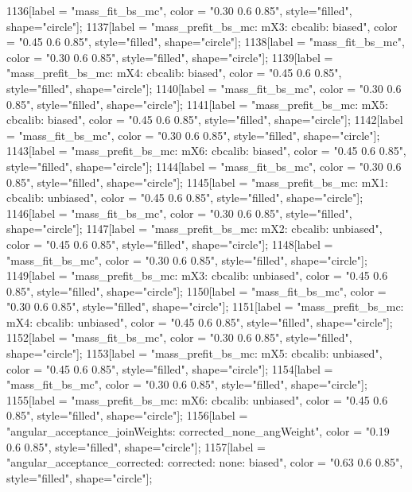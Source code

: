 {	1136[label = "mass_fit_bs_mc", color = "0.30 0.6 0.85", style="filled", shape="circle"];
	1137[label = "mass_prefit_bs_mc\nmassbin: mX3\nmassmodel: cbcalib\ntrigger: biased", color = "0.45 0.6 0.85", style="filled", shape="circle"];
	1138[label = "mass_fit_bs_mc", color = "0.30 0.6 0.85", style="filled", shape="circle"];
	1139[label = "mass_prefit_bs_mc\nmassbin: mX4\nmassmodel: cbcalib\ntrigger: biased", color = "0.45 0.6 0.85", style="filled", shape="circle"];
	1140[label = "mass_fit_bs_mc", color = "0.30 0.6 0.85", style="filled", shape="circle"];
	1141[label = "mass_prefit_bs_mc\nmassbin: mX5\nmassmodel: cbcalib\ntrigger: biased", color = "0.45 0.6 0.85", style="filled", shape="circle"];
	1142[label = "mass_fit_bs_mc", color = "0.30 0.6 0.85", style="filled", shape="circle"];
	1143[label = "mass_prefit_bs_mc\nmassbin: mX6\nmassmodel: cbcalib\ntrigger: biased", color = "0.45 0.6 0.85", style="filled", shape="circle"];
	1144[label = "mass_fit_bs_mc", color = "0.30 0.6 0.85", style="filled", shape="circle"];
	1145[label = "mass_prefit_bs_mc\nmassbin: mX1\nmassmodel: cbcalib\ntrigger: unbiased", color = "0.45 0.6 0.85", style="filled", shape="circle"];
	1146[label = "mass_fit_bs_mc", color = "0.30 0.6 0.85", style="filled", shape="circle"];
	1147[label = "mass_prefit_bs_mc\nmassbin: mX2\nmassmodel: cbcalib\ntrigger: unbiased", color = "0.45 0.6 0.85", style="filled", shape="circle"];
	1148[label = "mass_fit_bs_mc", color = "0.30 0.6 0.85", style="filled", shape="circle"];
	1149[label = "mass_prefit_bs_mc\nmassbin: mX3\nmassmodel: cbcalib\ntrigger: unbiased", color = "0.45 0.6 0.85", style="filled", shape="circle"];
	1150[label = "mass_fit_bs_mc", color = "0.30 0.6 0.85", style="filled", shape="circle"];
	1151[label = "mass_prefit_bs_mc\nmassbin: mX4\nmassmodel: cbcalib\ntrigger: unbiased", color = "0.45 0.6 0.85", style="filled", shape="circle"];
	1152[label = "mass_fit_bs_mc", color = "0.30 0.6 0.85", style="filled", shape="circle"];
	1153[label = "mass_prefit_bs_mc\nmassbin: mX5\nmassmodel: cbcalib\ntrigger: unbiased", color = "0.45 0.6 0.85", style="filled", shape="circle"];
	1154[label = "mass_fit_bs_mc", color = "0.30 0.6 0.85", style="filled", shape="circle"];
	1155[label = "mass_prefit_bs_mc\nmassbin: mX6\nmassmodel: cbcalib\ntrigger: unbiased", color = "0.45 0.6 0.85", style="filled", shape="circle"];
	1156[label = "angular_acceptance_joinWeights\nwflag: corrected_none_angWeight", color = "0.19 0.6 0.85", style="filled", shape="circle"];
	1157[label = "angular_acceptance_corrected\nangacc: corrected\ncsp: none\ntrigger: biased", color = "0.63 0.6 0.85", style="filled", shape="circle"];
}
